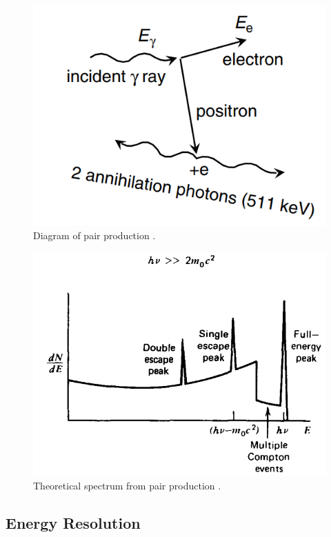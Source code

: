 \begin{figure}[H]
\centering
\includegraphics[width=0.6\linewidth]{images/pair_production}
\caption{Diagram of pair production \cite{gilmore}.}
\label{fig:pair_production}
\end{figure}

\begin{figure}[H]
\centering
\includegraphics[width=0.6\linewidth]{images/pair_production_spectra}
\caption{Theoretical spectrum from pair production \cite{knoll}.}
\label{fig:pair_production_spectra}
\end{figure}


\subsection{Energy Resolution}

